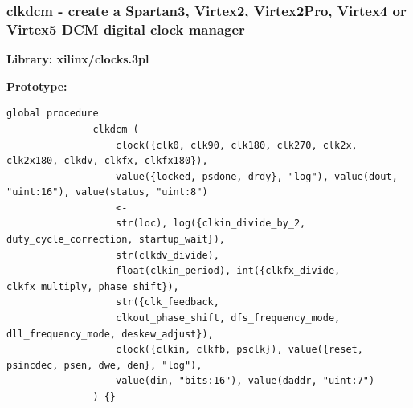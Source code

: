        \subsubsection{clkdcm - create a Spartan3, Virtex2, Virtex2Pro, Virtex4 or Virtex5 DCM digital clock manager}\label{sec:lpclkdcm}
            
            {\bf Library: xilinx/clocks.3pl}

            {\bf Prototype:} \\
            \vsp
            \begin{lstlisting}[gobble=12, language=threepl]
               global procedure
               clkdcm (
                   clock({clk0, clk90, clk180, clk270, clk2x, clk2x180, clkdv, clkfx, clkfx180}),
                   value({locked, psdone, drdy}, "log"), value(dout, "uint:16"), value(status, "uint:8")
                   <-
                   str(loc), log({clkin_divide_by_2, duty_cycle_correction, startup_wait}),
                   str(clkdv_divide),
                   float(clkin_period), int({clkfx_divide, clkfx_multiply, phase_shift}),
                   str({clk_feedback,
                   clkout_phase_shift, dfs_frequency_mode, dll_frequency_mode, deskew_adjust}),
                   clock({clkin, clkfb, psclk}), value({reset, psincdec, psen, dwe, den}, "log"),
                   value(din, "bits:16"), value(daddr, "uint:7")
               ) {}
            \end{lstlisting}

